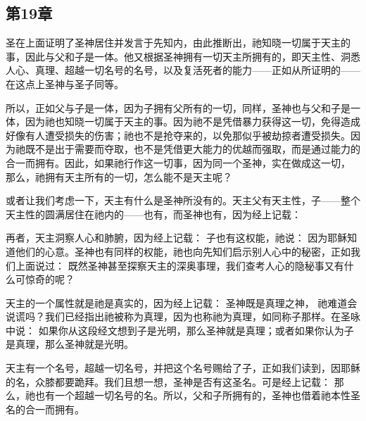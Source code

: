
\subsection{第19章}

圣在上面证明了圣神居住并发言于先知内，由此推断出，祂知晓一切属于天主的事，因此与父和子是一体。他又根据圣神拥有一切天主所拥有的，即天主性、洞悉人心、真理、超越一切名号的名号，以及复活死者的能力——正如从所证明的——在这点上圣神与圣子同等。\par

所以，正如父与子是一体，因为子拥有父所有的一切，同样，圣神也与父和子是一体，因为祂也知晓一切属于天主的事。因为祂不是凭借暴力获得这一切，免得造成好像有人遭受损失的伤害；祂也不是抢夺来的，以免那似乎被劫掠者遭受损失。因为祂既不是出于需要而夺取，也不是凭借更大能力的优越而强取，而是通过能力的合一而拥有。因此，如果祂行作这一切事，因为同一个圣神，实在做成这一切， 那么，祂拥有天主所有的一切，怎么能不是天主呢？\par

或者让我们考虑一下，天主有什么是圣神所没有的。天主父有天主性，子——整个天主性的圆满居住在祂内的——也有，而圣神也有，因为经上记载：\par

再者，天主洞察人心和肺腑，因为经上记载： 子也有这权能，祂说： 因为耶稣知道他们的心意。圣神也有同样的权能，祂也向先知们启示别人心中的秘密，正如我们上面说过： 既然圣神甚至探察天主的深奥事理，我们查考人心的隐秘事又有什么可惊奇的呢？\par

天主的一个属性就是祂是真实的，因为经上记载： 圣神既是真理之神， 祂难道会说谎吗？我们已经指出祂被称为真理，因为也称祂为真理，如同称子那样。在圣咏中说： 如果你从这段经文想到子是光明，那么圣神就是真理；或者如果你认为子是真理，那么圣神就是光明。\par

天主有一个名号，超越一切名号，并把这个名号赐给了子，正如我们读到，因耶稣的名，众膝都要跪拜。我们且想一想，圣神是否有这圣名。可是经上记载： 那么，祂也有一个超越一切名号的名。所以，父和子所拥有的，圣神也借着祂本性圣名的合一而拥有。\par


